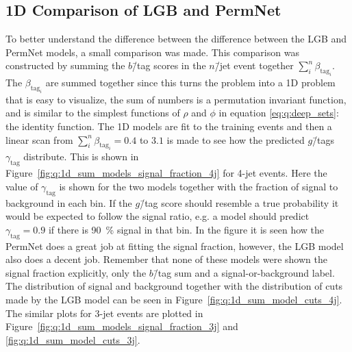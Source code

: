 \subsection{1D Comparison of LGB and PermNet}
\label{subsec:q:lgb_permnet_comparison}

To better understand the difference between the difference between the LGB and PermNet models, a small comparison was made. This comparison was constructed by summing the $b$\=/tag scores in the $n$\=/jet event together $\sum_i^n \beta_{\mathrm{tag}_i}$. The $\beta_{\mathrm{tag}_i}$ are summed together since this turns the problem into a \num{1}D problem that is easy to visualize, the sum of numbers is a permutation invariant function, and is similar to the simplest functions of $\rho$ and $\phi$ in equation \eqref{eq:q:deep_sets}: the identity function. The 1D models are fit to the training events and then a linear scan from $\sum_i^n \beta_{\mathrm{tag}_i}=0.4$ to $3.1$ is made to see how the predicted $g$\=/tags $\gamma_\mathrm{tag}$ distribute. This is shown in Figure~\ref{fig:q:1d_sum_models_signal_fraction_4j} for 4-jet events. Here the value of $\gamma_\mathrm{tag}$ is shown for the two models together with the fraction of signal to background in each bin. If the $g$\=/tag score should resemble a true probability it would be expected to follow the signal ratio, e.g. a model should predict $\gamma_\mathrm{tag}=0.9$ if there is \SI{90}{\percent} signal in that bin. In the figure it is seen how the PermNet does a great job at fitting the signal fraction, however, the LGB model also does a decent job. Remember that none of these models were shown the signal fraction explicitly, only the $b$\=/tag sum and a signal-or-background label. The distribution of signal and background together with the distribution of cuts made by the LGB model can be seen in Figure~\ref{fig:q:1d_sum_model_cuts_4j}. The similar plots for 3-jet events are plotted in Figure~\ref{fig:q:1d_sum_models_signal_fraction_3j} and \ref{fig:q:1d_sum_model_cuts_3j}.

